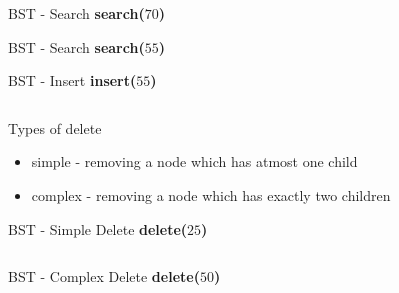 \documentclass{beamer}
\begin{document}
\begin{frame}{BST - Search}
\textbf{search($70$)}\\

\end{frame}

\begin{frame}{BST - Search}
\textbf{search($55$)}\\

\end{frame}

\begin{frame}{BST - Insert}
\textbf{insert($55$)}\\
\begin{columns}
\begin{column}[t]{0.48\textwidth}

\end{column}
\pause
\pause
\begin{column}[t]{0.5\textwidth}

\end{column}
\end{columns}
\end{frame}

\begin{frame}{Types of delete}
\begin{itemize}
\item simple - removing a node which has atmost one child
\item complex - removing a node which has exactly two children
\end{itemize}
\end{frame}

\begin{frame}{BST - Simple Delete}
\textbf{delete($25$)}
\begin{figure}[b]
\begin{columns}
\begin{column}[t]{0.48\textwidth}

\end{column}
\pause
\pause
\begin{column}[t]{0.5\textwidth}

\end{column}
\end{columns}
\end{figure}
\end{frame}

\begin{frame}{BST - Complex Delete}
\textbf{delete($50$)}
\begin{figure}[b]
\begin{columns}
\begin{column}[t]{0.33\textwidth}

\end{column}
\pause
\pause
\pause
\begin{column}[t]{0.33\textwidth}

\end{column}
\pause
\begin{column}[t]{0.33\textwidth}

\end{column}
\end{columns}
\end{figure}
\end{frame}
\end{document}

